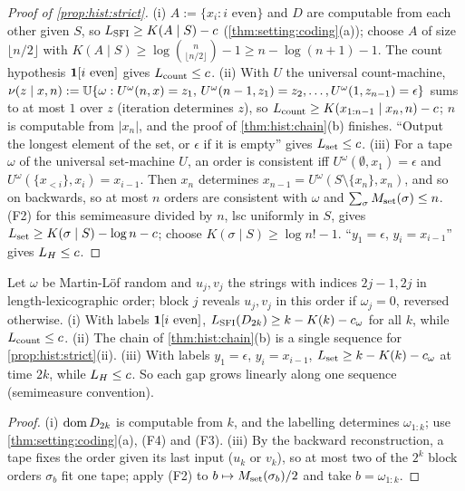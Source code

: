 \begin{proof}[Proof of \cref{prop:hist:strict}]
(i) $A:=\{x_i:i\text{ even}\}$ and $D$ are computable from each other given $S$, so $L_{\mathrm{SFI}}\ge K(A\mid S)-c$ (\cref{thm:setting:coding}(a)); choose $A$ of size $\lfloor n/2\rfloor$ with $K(A\mid S)\ge\log\binom n{\lfloor n/2\rfloor}-1\ge n-\log(n+1)-1$. The count hypothesis $\mathbf{1}[i\text{ even}]$ gives $L_{\rm count}\le c$.
(ii) With $U$ the universal count-machine, $\nu(z\mid x,n):=\mathbb{U}\{\omega:U^\omega(n,x)=z_1,\,U^\omega(n-1,z_1)=z_2,\dots,U^\omega(1,z_{n-1})=\epsilon\}$ sums to at most $1$ over $z$ (iteration determines $z$), so $L_{\rm count}\ge K(x_{1:n-1}\mid x_n,n)-c$; $n$ is computable from $|x_n|$, and the proof of \cref{thm:hist:chain}(b) finishes. ``Output the longest element of the set, or $\epsilon$ if it is empty'' gives $L_{\rm set}\le c$.
(iii) For a tape $\omega$ of the universal set-machine $U$, an order is consistent iff $U^\omega(\emptyset,x_1)=\epsilon$ and $U^\omega(\{x_{<i}\},x_i)=x_{i-1}$. Then $x_n$ determines $x_{n-1}=U^\omega(S\setminus\{x_n\},x_n)$, and so on backwards, so at most $n$ orders are consistent with $\omega$ and $\sum_\sigma M_{\mathrm{set}}(\sigma)\le n$. (F2) for this semimeasure divided by $n$, lsc uniformly in $S$, gives $L_{\rm set}\ge K(\sigma\mid S)-\log n-c$; choose $K(\sigma\mid S)\ge\log n!-1$. ``$y_1=\epsilon$, $y_i=x_{i-1}$'' gives $L_{H}\le c$.
\end{proof}

\begin{proposition}\label{prop:hist:strictinf}
Let $\omega$ be Martin-L\"of random and $u_j,v_j$ the strings with indices $2j-1,2j$ in length-lexicographic order; block $j$ reveals $u_j,v_j$ in this order if $\omega_j=0$, reversed otherwise. (i) With labels $\mathbf{1}[i\text{ even}]$, $L_{\mathrm{SFI}}(D_{2k})\ge k-K(k)-c_\omega$ for all $k$, while $L_{\rm count}\le c$. (ii) The chain of \cref{thm:hist:chain}(b) is a single sequence for \cref{prop:hist:strict}(ii). (iii) With labels $y_1=\epsilon$, $y_i=x_{i-1}$, $L_{\rm set}\ge k-K(k)-c_\omega$ at time $2k$, while $L_{H}\le c$. So each gap grows linearly along one sequence (semimeasure convention).
\end{proposition}

\begin{proof}
(i) $\operatorname{dom} D_{2k}$ is computable from $k$, and the labelling determines $\omega_{1:k}$; use \cref{thm:setting:coding}(a), (F4) and (F3). (iii) By the backward reconstruction, a tape fixes the order given its last input ($u_k$ or $v_k$), so at most two of the $2^k$ block orders $\sigma_b$ fit one tape; apply (F2) to $b\mapsto M_{\mathrm{set}}(\sigma_b)/2$ and take $b=\omega_{1:k}$.
\end{proof}

